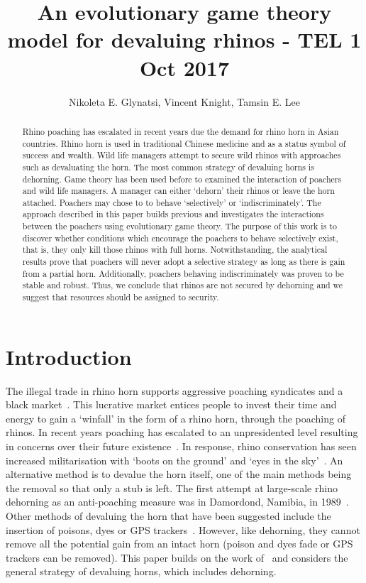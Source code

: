 \documentclass[10pt]{article}
\title{An evolutionary game theory model for devaluing rhinos - TEL 1 Oct 2017}
\author{Nikoleta E. Glynatsi, Vincent Knight, Tamsin E. Lee} %
\date{}
\begin{document}
\maketitle

\begin{abstract}

Rhino poaching has escalated in recent years due the demand for rhino horn in 
Asian countries. Rhino horn is used in traditional Chinese medicine and as a 
status symbol of success and wealth. Wild life managers attempt to secure
wild rhinos with approaches such as devaluating the horn. 
The  most common strategy of devaluing horns is dehorning. Game theory has
been used before to examined the interaction of poachers and
wild life managers.  A manager can either `dehorn' their rhinos or leave the
horn attached. Poachers may chose to to behave `selectively' or `indiscriminately'.
The approach described in this paper builds previous and investigates 
the interactions  between the poachers using evolutionary game theory. 
The purpose of this work is to discover whether conditions which encourage
the poachers to behave selectively exist, that is, they only kill those rhinos with
full horns. Notwithstanding, the analytical results prove that poachers will never
adopt a selective strategy as long as there is gain from a partial horn. 
Additionally, poachers behaving indiscriminately was proven to be stable and 
robust. Thus, we conclude that  rhinos are not secured by dehorning 
and we suggest that resources should be assigned to security.

\end{abstract}

\section{Introduction}\label{section:introduction}

The illegal trade in rhino horn supports aggressive poaching syndicates and a 
black market~\cite{Nowell1992}. This lucrative market entices people to invest
their time and energy to gain a `winfall' in the form of a rhino horn, through the 
poaching of rhinos. In recent years poaching has escalated to an unpresidented 
level resulting in concerns over their future existence~\cite{Smith1993}. In 
response, rhino conservation has seen increased  militarisation with `boots on the 
ground' and `eyes in the sky'~\cite{duffy_st}. An alternative method is to 
devalue the horn itself, one of the main  methods being the removal so that only
a stub is left. The first attempt at large-scale rhino dehorning as an anti-poaching
measure was in Damordond,  Namibia, in 1989~\cite{Milner1992}. Other methods
of devaluing the horn that have been suggested include
the insertion of poisons, dyes or GPS trackers~\cite{Gill2010,Smith1993}. However, 
like dehorning, they cannot remove all the potential gain from an intact horn 
(poison and dyes fade or GPS trackers can be removed). This paper builds on 
the work of~\cite{Lee} and considers the general strategy of devaluing horns,
which includes dehorning.
\end{document}
